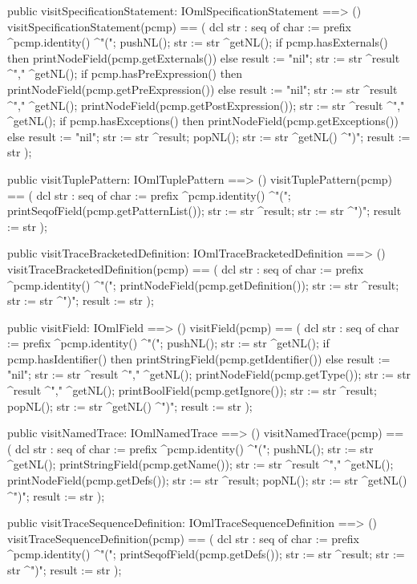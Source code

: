 \begin{vdm_al}
  public visitSpecificationStatement: IOmlSpecificationStatement ==> ()
  visitSpecificationStatement(pcmp) ==
    ( dcl str : seq of char := prefix ^pcmp.identity() ^"(";
      pushNL();
      str := str ^getNL();
      if pcmp.hasExternals()
      then printNodeField(pcmp.getExternals())
      else result := "nil";
      str := str ^result ^"," ^getNL();
      if pcmp.hasPreExpression()
      then printNodeField(pcmp.getPreExpression())
      else result := "nil";
      str := str ^result ^"," ^getNL();
      printNodeField(pcmp.getPostExpression());
      str := str ^result ^"," ^getNL();
      if pcmp.hasExceptions()
      then printNodeField(pcmp.getExceptions())
      else result := "nil";
      str := str ^result;
      popNL();
      str := str ^getNL() ^")";
      result := str );

  public visitTuplePattern: IOmlTuplePattern ==> ()
  visitTuplePattern(pcmp) ==
    ( dcl str : seq of char := prefix ^pcmp.identity() ^"(";
      printSeqofField(pcmp.getPatternList());
      str := str ^result;
      str := str ^")";
      result := str );

  public visitTraceBracketedDefinition: IOmlTraceBracketedDefinition ==> ()
  visitTraceBracketedDefinition(pcmp) ==
    ( dcl str : seq of char := prefix ^pcmp.identity() ^"(";
      printNodeField(pcmp.getDefinition());
      str := str ^result;
      str := str ^")";
      result := str );

  public visitField: IOmlField ==> ()
  visitField(pcmp) ==
    ( dcl str : seq of char := prefix ^pcmp.identity() ^"(";
      pushNL();
      str := str ^getNL();
      if pcmp.hasIdentifier()
      then printStringField(pcmp.getIdentifier())
      else result := "nil";
      str := str ^result ^"," ^getNL();
      printNodeField(pcmp.getType());
      str := str ^result ^"," ^getNL();
      printBoolField(pcmp.getIgnore());
      str := str ^result;
      popNL();
      str := str ^getNL() ^")";
      result := str );

  public visitNamedTrace: IOmlNamedTrace ==> ()
  visitNamedTrace(pcmp) ==
    ( dcl str : seq of char := prefix ^pcmp.identity() ^"(";
      pushNL();
      str := str ^getNL();
      printStringField(pcmp.getName());
      str := str ^result ^"," ^getNL();
      printNodeField(pcmp.getDefs());
      str := str ^result;
      popNL();
      str := str ^getNL() ^")";
      result := str );

  public visitTraceSequenceDefinition: IOmlTraceSequenceDefinition ==> ()
  visitTraceSequenceDefinition(pcmp) ==
    ( dcl str : seq of char := prefix ^pcmp.identity() ^"(";
      printSeqofField(pcmp.getDefs());
      str := str ^result;
      str := str ^")";
      result := str );


\end{vdm_al}
